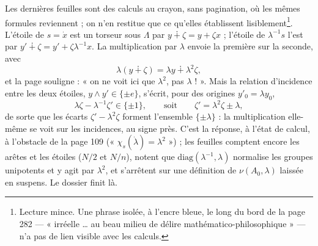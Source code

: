 \documentclass[11pt,a4paper]{article}
\begin{document}
Les dernières feuilles sont des calculs au crayon, sans pagination, où les
mêmes formules reviennent ; on n'en restitue que ce qu'elles établissent
lisiblement\footnote{Lecture mince. Une phrase isolée, à l'encre bleue, le
long du bord de la page 282 --- « irréelle … au beau milieu de délire
mathématico-philosophique » --- n'a pas de lien visible avec les calculs.}.
L'étoile de $s = \dot x$ est un torseur sous $\Lambda$ par $y \dotplus \zeta = y +
\zeta x$ ; l'étoile de $\lambda^{-1}s$ l'est par $y' \dotplus \zeta = y' +
\zeta\lambda^{-1}x$. La multiplication par $\lambda$ envoie la première sur la
seconde, avec
\[
  \lambda(y \dotplus \zeta) = \lambda y \dotplus \lambda^2\zeta ,
\]
et la page souligne : « on ne voit ici que $\lambda^2$, pas $\lambda$ ! ». Mais la
relation d'incidence entre les deux étoiles, $y \wedge y' \in \{\pm e\}$, s'écrit,
pour des origines $y'_0 = \lambda y_0$,
\[
  \lambda\zeta - \lambda^{-1}\zeta' \in \{\pm 1\} , \qquad \text{soit} \qquad
  \zeta' = \lambda^2\zeta \pm \lambda ,
\]
de sorte que les écarts $\zeta' - \lambda^2\zeta$ forment l'ensemble $\{\pm
\lambda\}$ : la multiplication elle-même se voit sur les incidences, au signe
près. C'est la réponse, à l'état de calcul, à l'obstacle de la page 109
(« $\chi_s(\dot\lambda) = \lambda^2$ ») ; les feuilles comptent encore les
arêtes et les étoiles ($N/2$ et $N/n$), notent que $\mathrm{diag}(\lambda^{-1},
\lambda)$ normalise les groupes unipotents et y agit par $\lambda^2$, et
s'arrêtent sur une définition de $\nu(A_0, \lambda)$ laissée en suspens. Le
dossier finit là.
\end{document}
